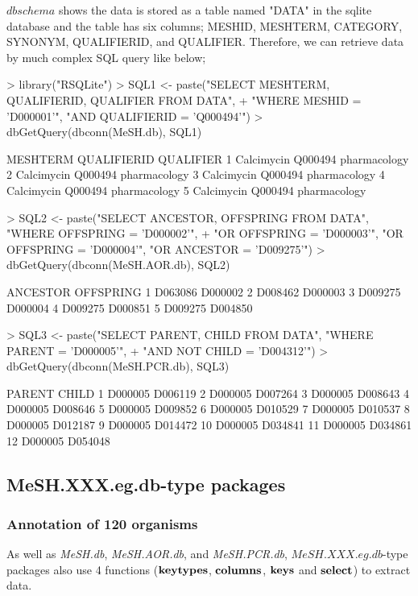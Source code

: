 \documentclass[11pt]{article}
\newcommand{\Rpackage}[1]{{\textit{#1}}}
\begin{document}
$dbschema$ shows the data is stored as a table named "DATA" in the sqlite database and the table has six columns; MESHID, MESHTERM, CATEGORY, SYNONYM, QUALIFIERID, and QUALIFIER. Therefore, we can retrieve data by much complex SQL query like below;
\begin{center}
\begin{Schunk}
\begin{Sinput}
> library("RSQLite")
> SQL1 <- paste("SELECT MESHTERM, QUALIFIERID, QUALIFIER FROM DATA", 
+     "WHERE MESHID = 'D000001'", "AND QUALIFIERID = 'Q000494'")
> dbGetQuery(dbconn(MeSH.db), SQL1)
\end{Sinput}
\begin{Soutput}
    MESHTERM QUALIFIERID    QUALIFIER
1 Calcimycin     Q000494 pharmacology
2 Calcimycin     Q000494 pharmacology
3 Calcimycin     Q000494 pharmacology
4 Calcimycin     Q000494 pharmacology
5 Calcimycin     Q000494 pharmacology
\end{Soutput}
\begin{Sinput}
> SQL2 <- paste("SELECT ANCESTOR, OFFSPRING FROM DATA", "WHERE OFFSPRING = 'D000002'", 
+     "OR OFFSPRING = 'D000003'", "OR OFFSPRING = 'D000004'", "OR ANCESTOR = 'D009275'")
> dbGetQuery(dbconn(MeSH.AOR.db), SQL2)
\end{Sinput}
\begin{Soutput}
  ANCESTOR OFFSPRING
1  D063086   D000002
2  D008462   D000003
3  D009275   D000004
4  D009275   D000851
5  D009275   D004850
\end{Soutput}
\begin{Sinput}
> SQL3 <- paste("SELECT PARENT, CHILD FROM DATA", "WHERE PARENT = 'D000005'", 
+     "AND NOT CHILD = 'D004312'")
> dbGetQuery(dbconn(MeSH.PCR.db), SQL3)
\end{Sinput}
\begin{Soutput}
    PARENT   CHILD
1  D000005 D006119
2  D000005 D007264
3  D000005 D008643
4  D000005 D008646
5  D000005 D009852
6  D000005 D010529
7  D000005 D010537
8  D000005 D012187
9  D000005 D014472
10 D000005 D034841
11 D000005 D034861
12 D000005 D054048
\end{Soutput}
\end{Schunk}
\end{center}

\clearpage
\subsection{MeSH.XXX.eg.db-type packages}
\subsubsection{Annotation of 120 organisms}
As well as \Rpackage{MeSH.db},  \Rpackage{MeSH.AOR.db}, and \Rpackage{MeSH.PCR.db}, $MeSH.XXX.eg.db$-type packages also use 4 functions ($\bf{keytypes}$, $\bf{columns}$, $\bf{keys}$ and $\bf{select}$) to extract data.
\end{document}
